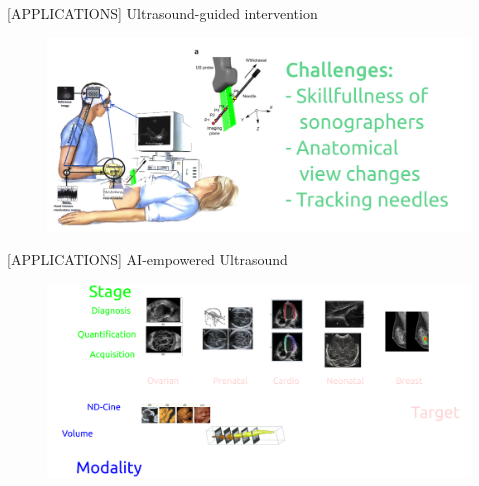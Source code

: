 {
    \begin{frame}{[\faUserMd APPLICATIONS] Ultrasound-guided intervention}
      \begin{figure}
        \centering
        \includegraphics[width=1.0\textwidth]{./../figures/sonographer-probe-patient/versions/drawing-v03.png}
      \end{figure}
\end{frame}
}


{
    \begin{frame}{[\faUserMd APPLICATIONS] AI-empowered Ultrasound}
      \begin{figure}
        \centering
        \includegraphics[width=1.0\textwidth]{./../figures/ai-empowered-us/versions/drawing-v01.png}
      \end{figure}
\end{frame}
}

